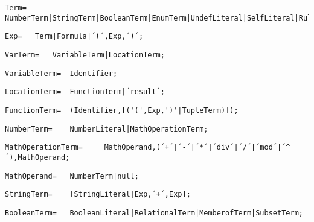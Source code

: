 \documentclass{article}
\begin{document}
    \begin{lstlisting}[mathescape=true]
     Term= 	NumberTerm|StringTerm|BooleanTerm|EnumTerm|UndefLiteral|SelfLiteral|RuleAsTerm|ValueTerm|StructureTerm;
    \end{lstlisting}
    
    \begin{lstlisting}[mathescape=true]
     Exp= 	Term|Formula|´(´,Exp,´)´;
    \end{lstlisting}
    
    \begin{lstlisting}[mathescape=true]
     VarTerm= 	VariableTerm|LocationTerm;
    \end{lstlisting}
    
    \begin{lstlisting}[mathescape=true]
     VariableTerm= 	Identifier;
    \end{lstlisting}
    
    \begin{lstlisting}[mathescape=true]
     LocationTerm= 	FunctionTerm|´result´;
    \end{lstlisting}
    
    \begin{lstlisting}[mathescape=true]
     FunctionTerm= 	(Identifier,[('(',Exp,')'|TupleTerm)]);
    \end{lstlisting}
    
    \begin{lstlisting}[mathescape=true]
     NumberTerm= 	NumberLiteral|MathOperationTerm;
    \end{lstlisting}
    
    \begin{lstlisting}[mathescape=true]
     MathOperationTerm= 	MathOperand,(´+´|´-´|´*´|´div´|´/´|´mod´|´^´),MathOperand;
    \end{lstlisting}
    
    \begin{lstlisting}[mathescape=true]
     MathOperand= 	NumberTerm|null;
    \end{lstlisting}
    
    \begin{lstlisting}[mathescape=true]
     StringTerm= 	[StringLiteral|Exp,´+´,Exp];
    \end{lstlisting}
    
    \begin{lstlisting}[mathescape=true]
     BooleanTerm= 	BooleanLiteral|RelationalTerm|MemberofTerm|SubsetTerm;
    \end{lstlisting}
    
\end{document}
